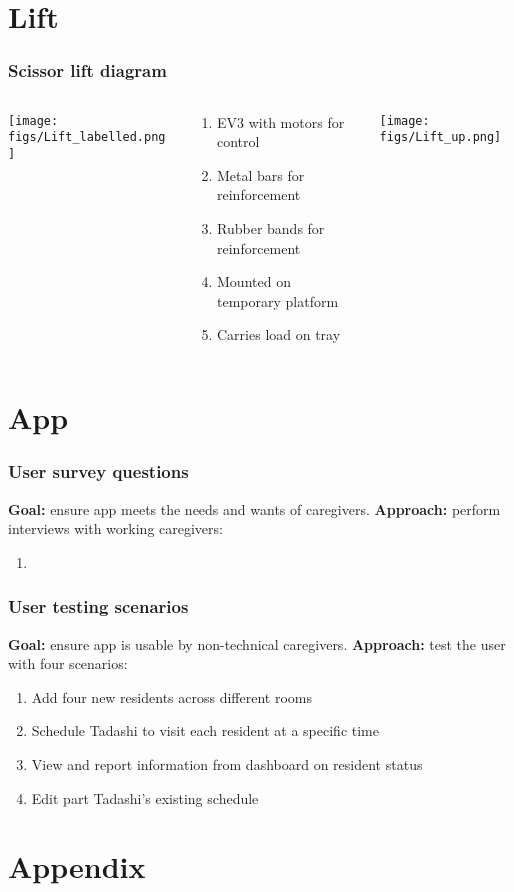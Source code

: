 \documentclass{beamer}
\begin{document}
\section{Lift}
\begin{frame}
  \frametitle{Scissor lift diagram}
  \begin{columns}
    \begin{column}{0.3\textwidth}
      \begin{center}
        \texttt{[image: figs/Lift\_labelled.png]}
      \end{center}
    \end{column}
    \begin{column}{0.3\textwidth}
      \begin{center}
      \begin{enumerate}
        \item EV3 with motors for control
        \item Metal bars for reinforcement
        \item Rubber bands for reinforcement
        \item Mounted on temporary platform
        \item Carries load on tray
        \end{enumerate}
      \end{center}
    \end{column}
    \begin{column}{0.3\textwidth}
      \begin{center}
        \texttt{[image: figs/Lift\_up.png]}
      \end{center}
    \end{column}
  \end{columns}
\end{frame}

\section{App}
\begin{frame}
  \frametitle{User survey questions}
  {\bf Goal: } ensure app meets the needs and wants of caregivers.
  {\bf Approach: } perform interviews with working caregivers: 
  \begin{enumerate}
    \item 
  \end{enumerate}
\end{frame}

\begin{frame}
  \frametitle{User testing scenarios}
  {\bf Goal: } ensure app is usable by non-technical caregivers.
  {\bf Approach: } test the user with four scenarios:
  \begin{enumerate}
    \item Add four new residents across different rooms
    \item Schedule Tadashi to visit each resident at a specific time
    \item View and report information from dashboard on resident status
    \item Edit part Tadashi's existing schedule
  \end{enumerate}
\end{frame}

\section{Appendix}
\end{document}
